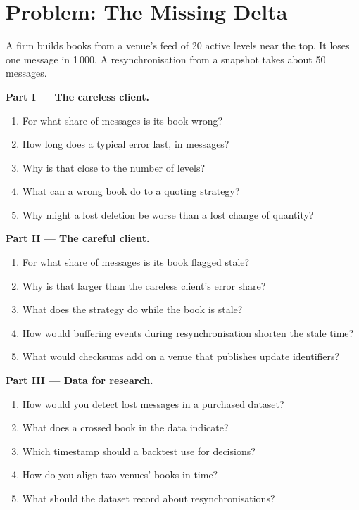 \section{Problem: The Missing Delta}

\begin{problem}\label{pb:m3:crypto-data-and-infrastructure:1}
A firm builds books from a venue's feed of 20 active levels near the top. It loses one message in 1\,000. A resynchronisation from a snapshot takes about 50
messages.

\medskip\noindent\textbf{Part I --- The careless client.}
\begin{enumerate}
\item For what share of messages is its book wrong?
\item How long does a typical error last, in messages?
\item Why is that close to the number of levels?
\item What can a wrong book do to a quoting strategy?
\item Why might a lost deletion be worse than a lost change of quantity?
\end{enumerate}

\medskip\noindent\textbf{Part II --- The careful client.}
\begin{enumerate}[resume]
\item For what share of messages is its book flagged stale?
\item Why is that larger than the careless client's error share?
\item What does the strategy do while the book is stale?
\item How would buffering events during resynchronisation shorten the stale time?
\item What would checksums add on a venue that publishes update identifiers?
\end{enumerate}

\medskip\noindent\textbf{Part III --- Data for research.}
\begin{enumerate}[resume]
\item How would you detect lost messages in a purchased dataset?
\item What does a crossed book in the data indicate?
\item Which timestamp should a backtest use for decisions?
\item How do you align two venues' books in time?
\item What should the dataset record about resynchronisations?
\end{enumerate}


\end{problem}
